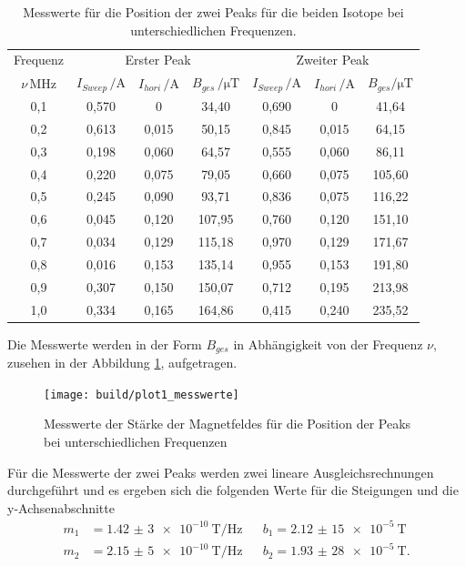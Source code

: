 \begin{table}
\centering
\caption{Messwerte für die Position der zwei Peaks für die beiden Isotope bei unterschiedlichen Frequenzen.}
\label{tab:messwerte}
\begin{tabular}{c| c c c | c c c }
\toprule
Frequenz & \multicolumn{3}{c}{Erster Peak} & \multicolumn{3}{c}{Zweiter Peak} \\
$\nu \, \si{\mega\hertz}$  & $I_{Sweep} \, \si{\per\ampere}$ &   $I_{hori} \, \si{\per\ampere}$ &  $B_{ges} \, \si{\per\micro\tesla}$ & $I_{Sweep} \, \si{\per\ampere}$
&   $I_{hori} \, \si{\per\ampere} $ & $ B_{ges} \si{\per\micro\tesla}$\\
\midrule
0,1 & 0,570 &  0       & 34,40  & 0,690 & 0      &   41,64 \\
0,2 & 0,613 &  0,015   & 50,15  & 0,845 & 0,015  &   64,15 \\
0,3 & 0,198 &  0,060   & 64,57  & 0,555 & 0,060  &   86,11 \\
0,4 & 0,220 &  0,075   & 79,05  & 0,660 & 0,075  &  105,60 \\
0,5 & 0,245 &  0,090   & 93,71  & 0,836 & 0,075  &  116,22 \\
0,6 & 0,045 &  0,120   & 107,95 & 0,760 & 0,120  &  151,10 \\
0,7 & 0,034 &  0,129   & 115,18 & 0,970 & 0,129  &  171,67 \\
0,8 & 0,016 &  0,153   & 135,14 & 0,955 & 0,153  &  191,80 \\
0,9 & 0,307 &  0,150   & 150,07 & 0,712 & 0,195  &  213,98 \\
1,0 & 0,334 &  0,165   & 164,86 & 0,415 & 0,240  &  235,52 \\
\bottomrule
\end{tabular}
\end{table}

Die Messwerte werden in der Form $B_{ges}$ in Abhängigkeit von der Frequenz $\nu$,
zusehen in der Abbildung \ref{fig:mess}, aufgetragen.

\begin{figure}
  \centering
  \texttt{[image: build/plot1\_messwerte]}
  \caption{Messwerte der Stärke der Magnetfeldes für die Position der Peaks bei unterschiedlichen Frequenzen}
  \label{fig:mess}
\end{figure}
\Floatbarrier
Für die Messwerte der zwei Peaks werden zwei lineare Ausgleichsrechnungen
durchgeführt und es ergeben sich die folgenden Werte für die Steigungen und die y-Achsenabschnitte
\begin{align*}
  m_1&= \SI{1,42(3)e-10}{\tesla\per\hertz}&    &b_1=\SI{2,12(15)e-5}{\tesla}\\
  m_2&= \SI{2,15(5)e-10}{\tesla\per\hertz}&    &b_2=\SI{1,93(28)e-5}{\tesla}.
\end{align*}

